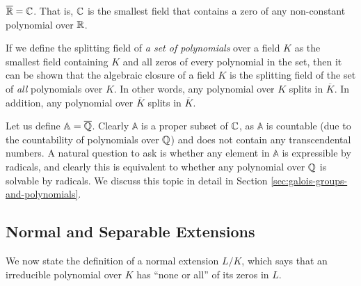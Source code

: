 \begin{example}
	$\overline {\mathbb R}  =  \mathbb C$. That is, $\mathbb C$ is the smallest field that contains a zero of any non-constant polynomial over $\mathbb R$.
\end{example}


If we define the splitting field of \textit{a set of polynomials} over a field $K$ as the smallest field containing $K$ and all zeros of every polynomial in the set, then it can be shown that the algebraic closure of a field $K$ is the splitting field of the set of \textit{all} polynomials over $K$. In other words, any polynomial over $K$ splits in $\overline K$. In addition, any polynomial over $\overline K$ splits in $\overline K$.

Let us define $\mathbb A = \overline {\mathbb Q}$. Clearly $\mathbb A$ is a proper subset of $\mathbb C$, as $\mathbb A$ is countable (due to the countability of polynomials over $\mathbb Q$) and does not contain any transcendental numbers. A natural question to ask is whether any element in $\mathbb A$ is expressible by radicals, and clearly this is equivalent to whether any polynomial over $\mathbb Q$ is solvable by radicals. We discuss this topic in detail in Section \ref{sec:galois-groups-and-polynomials}. 

%
%

%



\subsection{Normal and Separable Extensions}

We now state the definition of a normal extension $L/K$, which says that an irreducible polynomial over $K$ has ``none or all'' of its zeros in $L$. 

